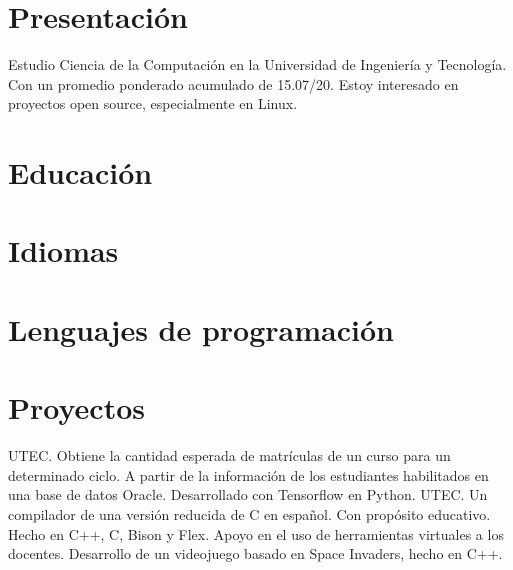 \documentclass[10pt, a4paper]{moderncv}
\begin{document}
\maketitle
\section{Presentación}
Estudio Ciencia de la Computación en la Universidad de Ingeniería y Tecnología.
Con un promedio ponderado acumulado de 15.07/20.
Estoy interesado en proyectos open source, especialmente en Linux.

\section{Educación}


\section{Idiomas}


\section{Lenguajes de programación}
\cvlistitem{\LaTeX}

\section{Proyectos}
{
	UTEC.
	Obtiene la cantidad esperada de matrículas de un curso para un
	determinado ciclo.
	A partir de la información de los estudiantes habilitados en
	una base de datos Oracle.
	Desarrollado con Tensorflow en Python.
}
{
	UTEC.
	Un compilador de una versión reducida de C en español.
	Con propósito educativo.
	Hecho en C++, C, Bison y Flex.
}
{
	Apoyo en el uso de herramientas virtuales a los docentes.
}
{
	Desarrollo de un videojuego basado en Space Invaders, hecho en C++.
}
\end{document}
